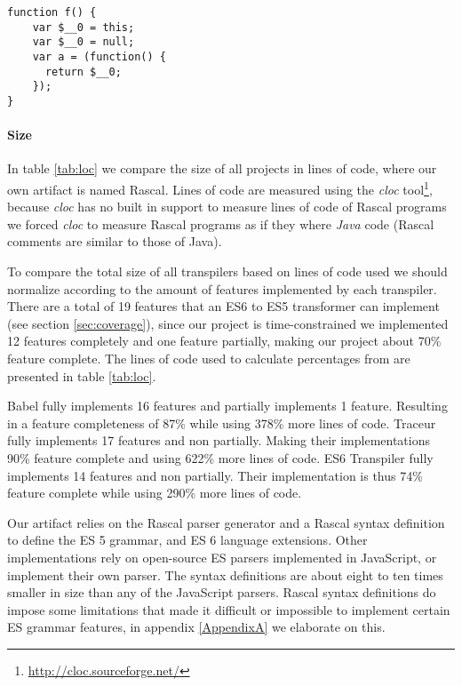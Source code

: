 \begin{lstlisting}[caption=Variable capture in Traceur transpiler,label=lst:traceurhygiene]
function f() {
    var $__0 = this;
    var $__0 = null;
    var a = (function() {
      return $__0;
	});
}
\end{lstlisting}


\paragraph{Size}
In table \ref{tab:loc} we compare the size of all projects in lines of code, where our own artifact is named Rascal. Lines of code are measured using the \textit{cloc} tool\footnote{\url{http://cloc.sourceforge.net/}}, because \textit{cloc} has no built in support to measure lines of code of Rascal programs we forced \textit{cloc} to measure Rascal programs as if they where \textit{Java} code (Rascal comments are similar to those of Java).

To compare the total size of all transpilers based on lines of code used we should normalize according to the amount of features implemented by each transpiler. There are a total of 19 features that an ES6 to ES5 transformer can implement (see section \ref{sec:coverage}), since our project is time-constrained we implemented 12 features completely and one feature partially, making our project about 70\% feature complete. The lines of code used to calculate percentages from are presented in table \ref{tab:loc}.

Babel fully implements 16 features and partially implements 1 feature. Resulting in a feature completeness of 87\% while using 378\% more lines of code. Traceur fully implements 17 features and non partially. Making their implementations 90\% feature complete and using 622\% more lines of code. ES6 Transpiler fully implements 14 features and non partially. Their implementation is thus 74\% feature complete while using 290\% more lines of code.

Our artifact relies on the Rascal parser generator and a Rascal syntax definition to define the ES 5 grammar, and ES 6 language extensions. Other implementations rely on open-source ES parsers implemented in JavaScript, or implement their own parser. The syntax definitions are about eight to ten times smaller in size than any of the JavaScript parsers. Rascal syntax definitions do impose some limitations that made it difficult or impossible to implement certain ES grammar features, in appendix \ref{AppendixA} we elaborate on this.

